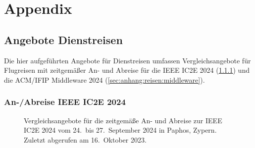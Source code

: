 \clearpage
\section{Appendix}
\label{sec:anhang}


\subsection{Angebote Dienstreisen}
\label{sec:anhang:reisen}

Die hier aufgeführten Angebote für Dienstreisen umfassen Vergleichsangebote für Flugreisen mit zeitgemäßer An- und Abreise für die IEEE IC2E 2024 (\cref{sec:anhang:reisen:ic2e}) und die ACM/IFIP Middleware 2024 (\cref{sec:anhang:reisen:middleware}).



\subsubsection{An-/Abreise IEEE IC2E 2024}
\label{sec:anhang:reisen:ic2e}

\begin{figure}[!h]
    \centering
    \caption{
        Vergleichsangebote für die zeitgemäße An- und Abreise zur IEEE IC2E 2024 vom 24.~bis 27.~September 2024 in Paphos, Zypern.
        Zuletzt abgerufen am 16.~Oktober 2023.
    }
\end{figure}

